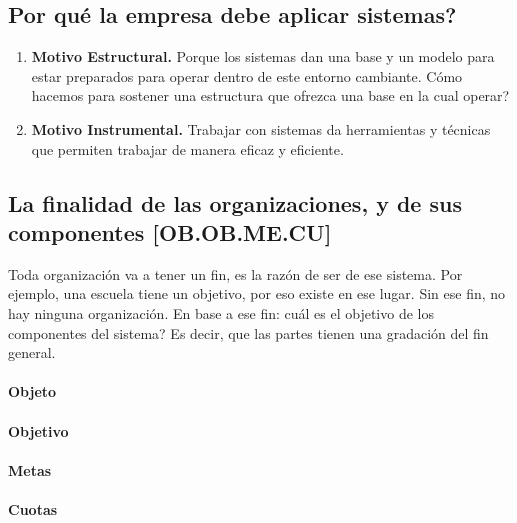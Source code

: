 \hypertarget{por-quuxe9-la-empresa-debe-aplicar-sistemas}{%
\subsection{Por qué la empresa debe aplicar
sistemas?}\label{por-quuxe9-la-empresa-debe-aplicar-sistemas}}

\begin{enumerate}
\def\labelenumi{\arabic{enumi}.}
\item
  \textbf{Motivo Estructural.} Porque los sistemas dan una base y un modelo para
  estar preparados para operar dentro de este entorno cambiante. Cómo
  hacemos para sostener una estructura que ofrezca una base en la cual
  operar?
\item
  \textbf{Motivo Instrumental.} Trabajar con sistemas da herramientas y técnicas
  que permiten trabajar de manera eficaz y eficiente.
\end{enumerate}

\hypertarget{la-finalidad-de-las-organizaciones-y-de-sus-componentes-ob.ob.me.cu}{%
\subsection{La finalidad de las organizaciones, y de sus componentes
{[}OB.OB.ME.CU{]}}\label{la-finalidad-de-las-organizaciones-y-de-sus-componentes-ob.ob.me.cu}}

Toda organización va a tener un fin, es la razón de ser de ese sistema.
Por ejemplo, una escuela tiene un objetivo, por eso existe en ese lugar.
Sin ese fin, no hay ninguna organización. En base a ese fin: cuál es el
objetivo de los componentes del sistema? Es decir, que las partes tienen
una gradación del fin general. 
\paragraph{Objeto}
\paragraph{Objetivo}
\paragraph{Metas}
\paragraph{Cuotas}

